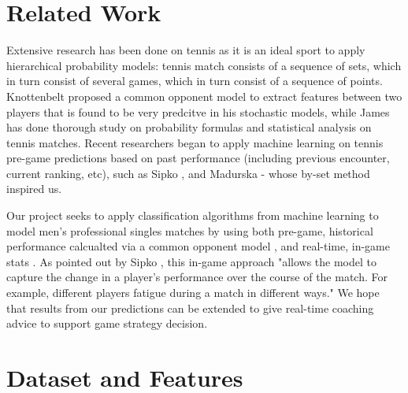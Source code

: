 \documentclass[paper=a4, fontsize=10pt]{scrartcl} %
\numberwithin{equation}{section} %
\numberwithin{figure}{section} %
\numberwithin{table}{section} %
\begin{document}
\section{Related Work}
Extensive research has been done on tennis as it is an ideal sport to apply hierarchical probability models: tennis match consists of a sequence of sets, which in turn consist of several games, which in turn consist of a sequence of points. Knottenbelt \cite{KNOTTENBELT20123820} proposed a common opponent model to extract features between two players that is found to be very predcitve in his stochastic models, while James \cite{omalley} has done thorough study on probability formulas and statistical analysis on tennis matches. Recent researchers began to apply machine learning on tennis pre-game predictions based on past performance (including previous encounter, current ranking, etc), such as Sipko \cite{tennis1}, and Madurska\cite{tennis2setbyset} - whose by-set method inspired us. 

Our project seeks to apply classification algorithms from machine learning to model men's professional singles matches by using both pre-game, historical performance calcualted via a common opponent model \cite{KNOTTENBELT20123820}, and real-time, in-game stats \cite{tennis_charting} \cite{tennis2setbyset}. As pointed out by Sipko \cite{tennis1}, this in-game approach "allows the model to capture the change in a player's performance over the course of the match. For example, different players fatigue during a match in different ways." We hope that results from our predictions can be extended to give real-time coaching advice to support game strategy decision.

\section{Dataset and Features}
\end{document}
